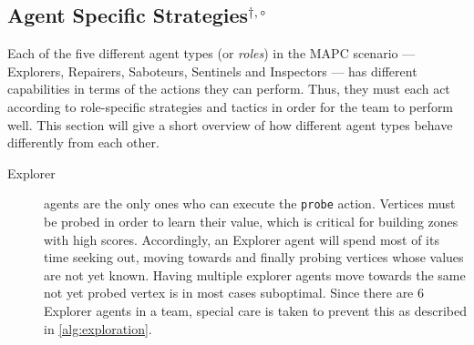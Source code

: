 \subsection[Agent Specific Strategies]{Agent Specific Strategies$^{\dagger,\circ}$}\label{alg:agentstrategies}
Each of the five different agent types (or \emph{roles}) in the MAPC scenario --- Explorers, Repairers, Saboteurs, Sentinels and Inspectors --- has different capabilities in terms of the actions they can perform.
Thus, they must each act according to role-specific strategies and tactics in order for the team to perform well.
This section will give a short overview of how different agent types behave differently from each other.
\begin{description}
    \item[Explorer] agents are the only ones who can execute the \texttt{probe} action.
        Vertices must be probed in order to learn their value, which is critical for building zones with high scores.
        Accordingly, an Explorer agent will spend most of its time seeking out, moving towards and finally probing vertices whose values are not yet known.
        Having multiple explorer agents move towards the same not yet probed vertex is in most cases suboptimal.
        Since there are 6 Explorer agents in a team, special care is taken to prevent this as described in \autoref{alg:exploration}.


\end{description}
